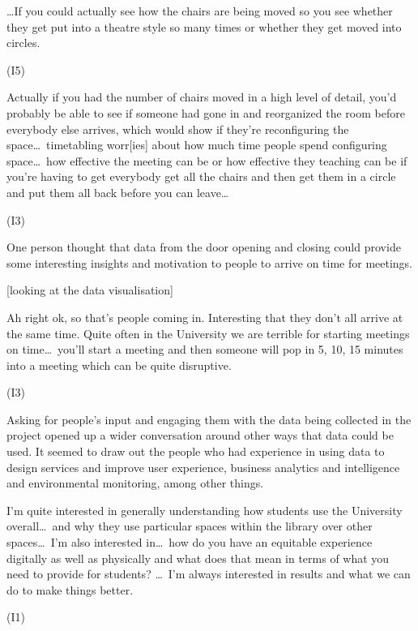 \begin{qt}\ldots If you could actually see how the chairs are being moved so you see
whether they get put into a theatre style so many times or whether
they get moved into circles.\end{qt} (I5)

\begin{qt}Actually if you had the number of chairs moved in a high level of
detail, you’d probably be able to see if someone had gone in and
reorganized the room before everybody else arrives, which would show
if they’re reconfiguring the space\ldots\  timetabling worr[ies] about how
much time people spend configuring space\ldots\ {}how effective the meeting can
be or how effective they teaching can be if you’re having to get
everybody get all the chairs and then get them in a circle and put
them all back before you can leave\ldots\ {}\end{qt} (I3)

One person thought that data from the door opening and closing could provide
some interesting insights and motivation to people to arrive on time
for meetings.

[looking at the data visualisation]\begin{qt}Ah right ok, so that’s people coming in. Interesting that they don’t
all arrive at the same time. Quite often in the University we are
terrible for starting meetings on time\ldots\  you’ll start a meeting and then someone will pop in
5, 10, 15 minutes into a meeting which can be quite disruptive.\end{qt} (I3)

Asking for people’s input and engaging them with the data being
collected in the project opened up a wider conversation around other
ways that data could be used. It seemed to draw out the people who had
experience in using data to design services and improve user
experience, business analytics and intelligence and environmental
monitoring, among other things.

\begin{qt}I’m quite interested in generally understanding how students use the
University overall\ldots\  and why they use particular spaces within the
library over other spaces\ldots\  I’m also interested in\ldots\  how do you have an
equitable experience digitally as well as physically and what does
that mean in terms of what you need to provide for students? \ldots\  I’m always interested in results and what we can
do to make things better.\end{qt} (I1)

